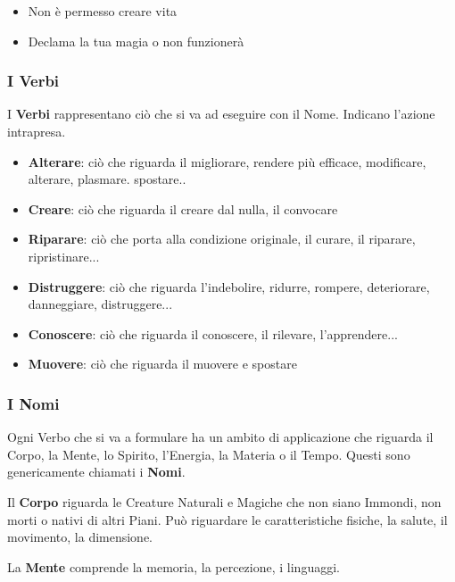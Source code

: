 \documentclass[a4paper,twoside,openany]{book}
\begin{document}
\begin{multicols}{2}
\begin{itemize}[leftmargin=*]
\item Non è permesso creare vita

\item Declama la tua magia o non funzionerà

\end{itemize}

\subsubsection{I Verbi}

I \textbf{Verbi} rappresentano ciò che si va ad eseguire con il Nome. Indicano l'azione intrapresa.\\

\begin{itemize}[leftmargin=*] \setlength{\itemsep}{0pt}

\item \textbf{Alterare}: ciò che riguarda il migliorare, rendere più efficace, modificare, alterare, plasmare. spostare..
\item \textbf{Creare}: ciò che riguarda il creare dal nulla, il convocare
\item \textbf{Riparare}: ciò che porta alla condizione originale, il curare, il riparare, ripristinare...
\item \textbf{Distruggere}: ciò che riguarda l'indebolire, ridurre, rompere, deteriorare, danneggiare, distruggere...
\item \textbf{Conoscere}: ciò che riguarda il conoscere, il rilevare, l'apprendere...
\item \textbf{Muovere}: ciò che riguarda il muovere e spostare

\end{itemize}

\subsubsection{I Nomi}

Ogni Verbo che si va a formulare ha un ambito di applicazione che riguarda il Corpo, la Mente, lo Spirito, l'Energia, la Materia o il Tempo. Questi sono genericamente chiamati i \textbf{Nomi}.

Il \textbf{Corpo} riguarda le Creature Naturali e Magiche che non siano Immondi, non morti o nativi di altri Piani. Può riguardare le caratteristiche fisiche, la salute, il movimento, la dimensione.

La \textbf{Mente} comprende la memoria, la percezione, i linguaggi.


\end{multicols}
\end{document}
